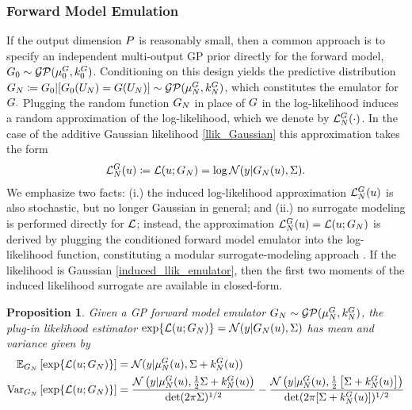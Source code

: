 \documentclass[12pt]{article}
\newtheorem{prop}{Proposition}
\begin{document}
\subsubsection{Forward Model Emulation}
If the output dimension $\dimObs$ is reasonably small, then a common approach is to specify an independent 
multi-output GP prior directly for the forward model, $\fwdPrior \sim \GP(\emMeanPrior{\fwd}, \emKerPrior{\fwd})$. 
Conditioning on this design yields the predictive distribution 
$\fwdEm[\Ndesign]  \Def \fwdPrior|[\fwdPrior(\designIn) = \fwd(\designIn)] \sim \GP(\emMean[\Ndesign]{\fwd}, \emKer[\Ndesign]{\fwd})$, 
which constitutes the emulator for $\fwd. $
Plugging the random function $\fwdEm[\Ndesign]$ in place of $\fwd$ in the log-likelihood induces a random approximation of the 
log-likelihood, which we denote by $\llikEmFwd(\cdot)$. 
In the case of the additive Gaussian likelihood \ref{llik_Gaussian} this approximation takes the form 
\begin{align}
\llikEmFwd(\Par) \Def \llik(\Par; \fwdEm) =  \log\Gaussian(\obs| \fwdEm[\Ndesign](\Par), \likPar). \label{induced_llik_emulator}
\end{align}
We emphasize two facts: (i.) the induced log-likelihood approximation $\llikEmFwd[\Ndesign](\Par)$ is also 
stochastic, but no longer Gaussian in general; and (ii.) no surrogate modeling is performed directly for $\llik$; instead, 
the approximation $\llikEmFwd[\Ndesign](\Par) = \llik(\Par; \fwdEm[\Ndesign])$ is derived by plugging the 
conditioned forward model emulator into the log-likelihood function, 
constituting a modular surrogate-modeling approach \citep{modularization}. If the likelihood is Gaussian  
\ref{induced_llik_emulator}, then the first two moments of the induced likelihood surrogate are available in closed-form.

\begin{prop} \label{fwd_em_lik_emulator_moments_Gaussian}
Given a GP forward model emulator $\fwdEm[\Ndesign] \sim \GP(\emMean[\Ndesign]{\fwd}, \emKer[\Ndesign]{\fwd})$, 
the plug-in likelihood estimator $\Exp{\llik(\Par; \fwdEm)} = \Gaussian(\obs| \fwdEm[\Ndesign](\Par), \likPar)$ has 
mean and variance given by 
\begin{align}
\E_{\fwdEm}\left[\Exp{\llik(\Par; \fwdEm)} \right] 
&= \Gaussian(\obs | \emMean[\Ndesign]{\fwd}(\Par), \likPar + \emKer[\Ndesign]{\fwd}(\Par)) \\
\Var_{\fwdEm}\left[\Exp{\llik(\Par; \fwdEm)} \right]
&= \frac{\Gaussian\left(\obs | \emMean[\Ndesign]{\fwd}(\Par), \frac{1}{2}\likPar + \emKer[\Ndesign]{\fwd}(\Par)  \right)}{\det(2\pi \likPar)^{1/2}}
- \frac{\Gaussian\left(\obs | \emMean[\Ndesign]{\fwd}(\Par), \frac{1}{2}\left[\likPar + \emKer[\Ndesign]{\fwd}(\Par)\right]  \right)}{\det(2\pi [\likPar + \emKer[\Ndesign]{\fwd}(\Par)])^{1/2}}
\end{align}
\end{prop}
\end{document}
